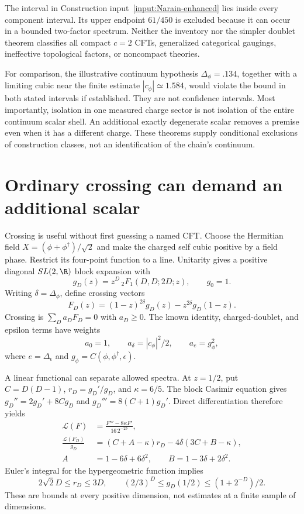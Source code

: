 The interval in Construction input~\ref{input:Narain-enhanced}
lies inside every component interval. Its upper endpoint
$61/450$ is excluded because it can occur in a bounded
two-factor spectrum. Neither the inventory nor the simpler
doublet theorem classifies all compact $c=2$ CFTs, generalized
categorical gaugings, ineffective topological factors, or
noncompact theories.

For comparison, the illustrative continuum hypothesis
$\Delta_\phi=.134$, together with a limiting cubic near the finite
estimate $|c_\phi|\simeq1.584$, would violate the bound in both
stated intervals if established.
They are not confidence intervals. Most importantly, isolation
in one measured charge sector is not isolation of the entire
continuum scalar shell. An additional exactly degenerate scalar
removes a premise even when it has a different charge. These
theorems supply conditional exclusions of construction classes,
not an identification of the chain's continuum.

\section{Ordinary crossing can demand an additional scalar}

Crossing is useful without first guessing a named CFT. Choose the
Hermitian field $X=(\phi+\phi^\dagger)/\sqrt2$ and make the charged
self cubic positive by a field phase. Restrict its four-point
function to a line. Unitarity gives a positive diagonal
$SL(2,\R)$ block expansion with
\[
 g_D(z)=z^D\,{}_2F_1(D,D;2D;z),\qquad g_0=1.
\]
Writing $\delta=\Delta_\phi$, define crossing vectors
\[
 F_D(z)=(1-z)^{2\delta}g_D(z)-z^{2\delta}g_D(1-z).
\]
Crossing is $\sum_Da_DF_D=0$ with $a_D\geq0$. The known identity,
charged-doublet, and epsilon terms have weights
\[
 a_0=1,\qquad a_\delta=|c_\phi|^2/2,
 \qquad a_e=g_\phi^2,
\]
where $e=\Delta_\epsilon$ and
$g_\phi=C(\phi,\phi^\dagger,\epsilon)$.

A linear functional can separate allowed spectra. At $z=1/2$, put
$C=D(D-1)$, $r_D=g_D'/g_D$, and $\kappa=6/5$. The block Casimir
equation gives $g_D''=2g_D'+8Cg_D$ and
$g_D'''=8(C+1)g_D'$. Direct differentiation therefore yields
\begin{align*}
 \mathcal L(F)&=\frac{F'''-8\kappa F'}{16\,2^{-2\delta}},\\
 \frac{\mathcal L(F_D)}{g_D}
 &=(C+A-\kappa)r_D-4\delta(3C+B-\kappa),\\
 A&=1-6\delta+6\delta^2,\qquad
 B=1-3\delta+2\delta^2.
\end{align*}
Euler's integral for the hypergeometric function implies
\[
 2\sqrt2D\leq r_D\leq3D,
 \qquad (2/3)^D\leq g_D(1/2)\leq(1+2^{-D})/2.
\]
These are bounds at every positive dimension, not estimates at a
finite sample of dimensions.

